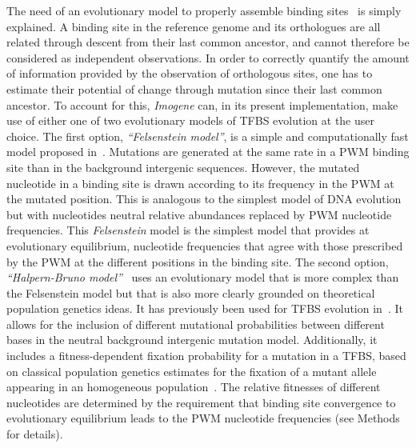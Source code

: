 \documentclass[a4,center,fleqn]{NAR}
\begin{document}
The need of an evolutionary model to properly assemble binding
sites~\cite{Sinha:2003vn,Moses:2004vn,siddharthan2005phylogibbs} is simply
explained.
A binding site in the reference genome and its orthologues  are all related
through descent from their last  common ancestor, and cannot therefore be
considered as independent observations.
In order to correctly quantify the amount of information provided by the
observation of orthologous sites, one has to estimate their potential of change
through mutation  since their last common ancestor.
To account for this, {\em Imogene} can, in its present implementation, make use
of either one of two evolutionary models of TFBS evolution at the user choice.
The first option, {\em ``Felsenstein model''}, is  a simple and computationally fast
model proposed in~\cite{Sinha:2003vn}.
Mutations are generated at the same rate in a PWM binding site than in the
background intergenic sequences.
However, the mutated nucleotide in a binding site is drawn according to its
frequency in the PWM at the mutated position.
This is analogous  to the simplest model of DNA
evolution~\cite{Felsenstein:1981ve} but with nucleotides neutral relative
abundances replaced by PWM nucleotide frequencies.
This {\em Felsenstein} model is the simplest model that provides at
evolutionary equilibrium, nucleotide frequencies that agree with those
prescribed by the PWM at the different positions in the binding site. 
The second option, {\em ``Halpern-Bruno model''}~\cite{Halpern:1998qf} uses an
evolutionary model that is more complex than the  Felsenstein model but that is
also more clearly grounded on theoretical population genetics ideas.
It has previously been used for TFBS evolution in~\cite{Moses:2004vn}.
It allows for the inclusion of different mutational probabilities between
different bases in the neutral background intergenic mutation model.
Additionally, it includes a fitness-dependent fixation probability for a
mutation in a TFBS, based on classical population genetics estimates for the
fixation of  a mutant allele appearing in an homogeneous
population~\cite{KIMURA:1962uq}.
The relative fitnesses of different nucleotides are determined by the
requirement that binding site convergence to evolutionary equilibrium leads to
the PWM nucleotide frequencies  (see Methods for details).
  
\end{document}
